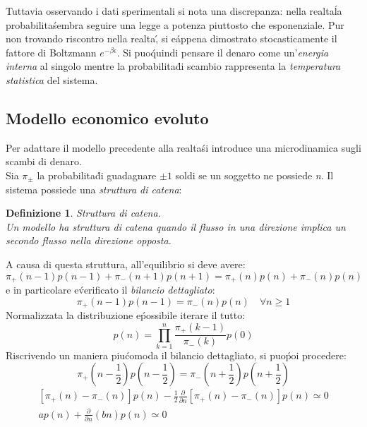 \documentclass[12pt, a4paper]{book}
\theoremstyle{theorem}
\newtheorem{definition}{Definizione}[section]
\begin{document}
				Tuttavia osservando i dati sperimentali si nota una discrepanza: nella realta\' la probabilita\' sembra seguire una legge a potenza piuttosto che esponenziale.
				Pur non trovando riscontro nella realta\', si e\' appena dimostrato stocasticamente il fattore di Boltzmann $e^{-\beta\epsilon}$.
				Si puo\' quindi pensare il denaro come un'\emph{energia interna} al singolo mentre la probabilita\' di scambio rappresenta la \emph{temperatura statistica} del sistema.
			\subsection{Modello economico evoluto}
				Per adattare il modello precedente alla realta\' si introduce una microdinamica sugli scambi di denaro.\\
				Sia $\pi_\pm$ la probabilita\' di guadagnare $\pm 1$ soldi se un soggetto ne possiede \textit{n}. Il sistema possiede una \textit{struttura di catena}:
				\begin{definition}
					Struttura di catena.\\
					Un modello ha struttura di catena quando il flusso in una direzione implica un secondo flusso nella direzione opposta.
				\end{definition}
				A causa di questa struttura, all'equilibrio si deve avere:
				\begin{equation*}
					\pi_+(n-1)p(n-1)+\pi_-(n+1)p(n+1)=\pi_+(n)p(n)+\pi_-(n)p(n)
				\end{equation*}
				e in particolare e\' verificato il \textit{bilancio dettagliato}:
				\begin{equation}
					\pi_+(n-1)p(n-1)=\pi_-(n)p(n)\quad \forall n\geq 1
				\end{equation}
				Normalizzata la distribuzione e\' possibile iterare il tutto:
				\begin{equation*}
					p(n)=\prod_{k=1}^n\frac{\pi_+(k-1)}{\pi_-(k)}p(0)
				\end{equation*}
				Riscrivendo un maniera piu\' comoda il bilancio dettagliato, si puo\' poi procedere:
				\begin{equation*}
					\pi_+(n-\frac{1}{2})p(n-\frac{1}{2})=\pi_-(n+\frac{1}{2})p(n+\frac{1}{2})
				\end{equation*}
				\begin{equation*}
					\begin{split}
						[\pi_+(n)-\pi_-(n)]p(n)-\frac{1}{2}\frac{\partial}{\partial n}[\pi_+(n)-\pi_-(n)]p(n)\simeq 0\\
						ap(n)+\frac{\partial}{\partial n}(bn)p(n)\simeq 0
					\end{split}
				\end{equation*}
\end{document}
